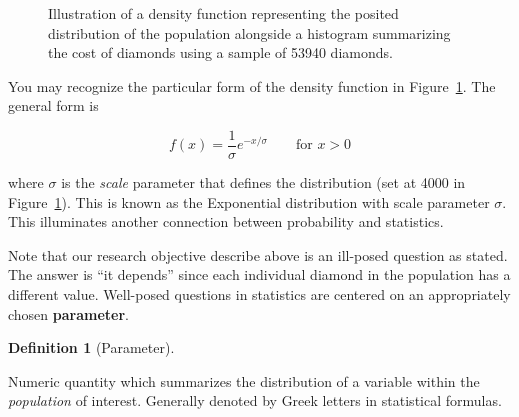 \documentclass[
  letterpaper,
  DIV=11,
  numbers=noendperiod]{scrreprt}
\theoremstyle{definition}
\newtheorem{definition}{Definition}[chapter]
\theoremstyle{plain}
\theoremstyle{definition}
\theoremstyle{remark}
\begin{document}
\begin{figure}


\caption{\label{fig-randomvariables-density}Illustration of a density
function representing the posited distribution of the population
alongside a histogram summarizing the cost of diamonds using a sample of
53940 diamonds.}

\end{figure}%

You may recognize the particular form of the density function in
Figure~\ref{fig-randomvariables-density}. The general form is

\[f(x) = \frac{1}{\sigma} e^{-x / \sigma} \qquad \text{for } x > 0\]

where \(\sigma\) is the \emph{scale} parameter that defines the
distribution (set at 4000 in Figure~\ref{fig-randomvariables-density}).
This is known as the Exponential distribution with scale parameter
\(\sigma\). This illuminates another connection between probability and
statistics.

Note that our research objective describe above is an ill-posed question
as stated. The answer is ``it depends'' since each individual diamond in
the population has a different value. Well-posed questions in statistics
are centered on an appropriately chosen \textbf{parameter}.

\begin{definition}[Parameter]\protect\hypertarget{def-parameter}{}\label{def-parameter}

Numeric quantity which summarizes the distribution of a variable within
the \emph{population} of interest. Generally denoted by Greek letters in
statistical formulas.

\end{definition}
\end{document}
